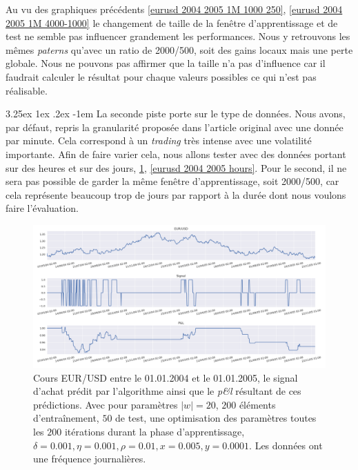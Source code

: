 \documentclass[a4paper, 11pt]{article}
\makeatletter
\renewcommand\paragraph{\@startsection{paragraph}{5}{\z@}%
  {3.25ex \@plus1ex \@minus.2ex}%
  {-1em}%
  {\normalfont\normalsize\bfseries}}
\makeatother
\begin{document}
Au vu des graphiques précédents \ref{eurusd 2004 2005 1M 1000 250}, \ref{eurusd 2004 2005 1M 4000-1000} le changement de taille de la fenêtre d'apprentissage et de test ne semble pas influencer grandement les performances. Nous y retrouvons les mêmes \textit{paterns} qu'avec un ratio de 2000/500, soit des gains locaux mais une perte globale. Nous ne pouvons pas affirmer que la taille n'a pas d'influence car il faudrait calculer le résultat pour chaque valeurs possibles ce qui n'est pas réalisable.

\paragraph{}
La seconde piste porte sur le type de données. Nous avons, par défaut, repris la granularité proposée dans l'article original avec une donnée par minute. Cela correspond à un \textit{trading} très intense avec une volatilité importante. Afin de faire varier cela, nous allons tester avec des données portant sur des heures et sur des jours, \ref{eurusd 2004 2005 days}, \ref{eurusd 2004 2005 hours}. Pour le second, il ne sera pas possible de garder la même fenêtre d'apprentissage, soit 2000/500, car cela représente beaucoup trop de jours par rapport à la durée dont nous voulons faire l'évaluation.

\begin{figure}
	\centering
	\includegraphics[scale=0.5]{res/eursud_2004-2005-days}
	\caption{Cours EUR/USD entre le 01.01.2004 et le 01.01.2005, le signal d'achat prédit par l'algorithme ainsi que le \textit{p\&l} résultant de ces prédictions. Avec pour paramètres $|w| = 20$, $200$ éléments d'entraînement, $50$ de test, une optimisation des
		paramètres toutes les $200$ itérations durant la phase d'apprentissage, $\delta = 0.001, \eta=0.001,\rho=0.01, x = 0.005, y=0.0001$. Les données ont une fréquence journalières.}
	\label{eurusd 2004 2005 days}
\end{figure}
\end{document}
